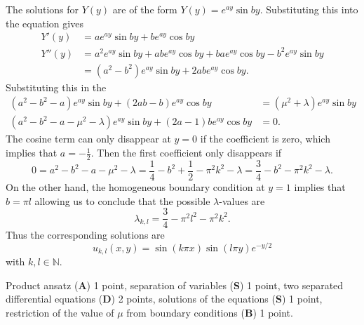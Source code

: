 \begin{diskussion}
The solutions for $Y(y)$ are of the form $Y(y) = e^{ay}\sin by$.
Substituting this into the equation gives
\begin{align*}
Y'(y)  &= ae^{ay}\sin by + b e^{ay} \cos by\\
Y''(y) &= a^2e^{ay}\sin by + abe^{ay}\cos by + bae^{ay}\cos by - b^2e^{ay}\sin by
\\
&= (a^2 -b^2) e^{ay}\sin by + 2abe^{ay} \cos by.
\end{align*}
Substituting this in the 
\begin{align*}
(a^2-b^2-a)e^{ay}\sin by
+(2ab-b)e^{ay}\cos by
&=
(\mu^2+\lambda)e^{ay}\sin by
\\
(a^2-b^2-a-\mu^2-\lambda)e^{ay}\sin by
+
(2a-1)be^{ay} \cos by
&=
0.
\end{align*}
The cosine term can only disappear at $y=0$ if the coefficient is zero,
which implies that $a=-\frac12$. 
Then the first coefficient only disappears if
\[
0
=
a^2-b^2-a-\mu^2-\lambda
=
\frac14-b^2+\frac12-\pi^2k^2-\lambda
=
\frac34 - b^2 -\pi^2k^2-\lambda.
\]
On the other hand, the homogeneous boundary condition at $y=1$ implies that
$b = \pi l$ allowing us to conclude that the possible $\lambda$-values
are
\[
\lambda_{k,l}
=
\frac34
-\pi^2 l^2
-\pi^2 k^2.
\]
Thus the corresponding solutions are
\[
u_{k,l}(x,y)
=
\sin(k\pi x)
\sin(l\pi y)
e^{-y/2}
\]
with $k,l\in\mathbb{N}$.
\end{diskussion}

\begin{bewertung}
Product ansatz ({\bf A}) 1 point,
separation of variables ({\bf S}) 1 point,
two separated differential equations ({\bf D}) 2 points,
solutions of the equations ({\bf S}) 1 point,
restriction of the value of $\mu$ from boundary conditions ({\bf B}) 1 point.
\end{bewertung}

